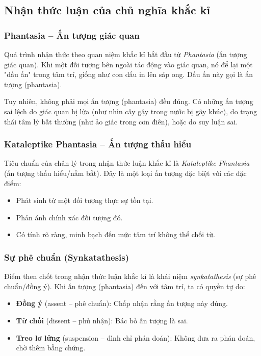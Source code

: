 \subsection{Nhận thức luận của chủ nghĩa khắc kỉ}

\subsubsection{Phantasia – Ấn tượng giác quan}

Quá trình nhận thức theo quan niệm khắc kỉ bắt đầu từ \textit{Phantasia} (ấn tượng giác quan). Khi một đối tượng bên ngoài tác động vào giác quan, nó để lại một "dấu ấn" trong tâm trí, giống như con dấu in lên sáp ong. Dấu ấn này gọi là ấn tượng (phantasia).

Tuy nhiên, không phải mọi ấn tượng (phantasia) đều đúng. Có những ấn tượng sai lệch do giác quan bị lừa (như nhìn cây gậy trong nước bị gãy khúc), do trạng thái tâm lý bất thường (như ảo giác trong cơn điên), hoặc do suy luận sai.

\subsubsection{Kataleptike Phantasia – Ấn tượng thấu hiểu}

Tiêu chuẩn của chân lý trong nhận thức luận khắc kỉ là \textit{Kataleptike Phantasia} (ấn tượng thấu hiểu/nắm bắt). Đây là một loại ấn tượng đặc biệt với các đặc điểm:
\begin{itemize}[leftmargin=1.5cm]
    \item Phát sinh từ một đối tượng thực sự tồn tại.
    \item Phản ánh chính xác đối tượng đó.
    \item Có tính rõ ràng, minh bạch đến mức tâm trí không thể chối từ.
\end{itemize}

\subsubsection{Sự phê chuẩn (Synkatathesis)}

Điểm then chốt trong nhận thức luận khắc kỉ là khái niệm \textit{synkatathesis} (sự phê chuẩn/đồng ý). Khi ấn tượng (phantasia) đến với tâm trí, ta có quyền tự do:
\begin{itemize}[leftmargin=1.5cm]
    \item \textbf{Đồng ý} (assent – phê chuẩn): Chấp nhận rằng ấn tượng này đúng.
    \item \textbf{Từ chối} (dissent – phủ nhận): Bác bỏ ấn tượng là sai.
    \item \textbf{Treo lơ lửng} (suspension – đình chỉ phán đoán): Không đưa ra phán đoán, chờ thêm bằng chứng.
\end{itemize}

